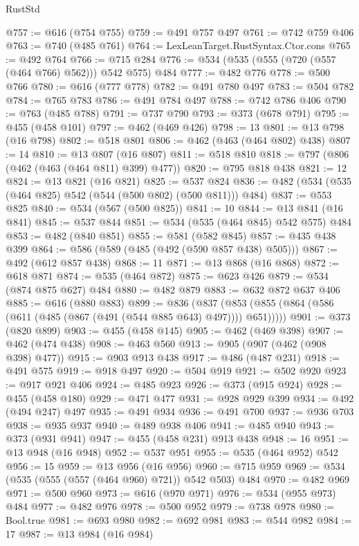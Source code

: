 \begin{lexlean}{RustStd}
\begin{coremodule}
{\begin{coremodule}
{{{{{{{{{{{{{{@757 := @616 (@754 @755)
@759 := @491 @757 @497
@761 := @742 @759 @406
@763 := @740 (@485 @761)
@764 := LexLeanTarget.RustSyntax.Ctor.cons
@765 := @492 @764
@766 := @715 @284
@776 := @534 (@535 (@555 (@720 (@557 (@464 @766) @562))) @542 @575) @484
@777 := @482 @776
@778 := @500 @766
@780 := @616 (@777 @778)
@782 := @491 @780 @497
@783 := @504 @782
@784 := @765 @783
@786 := @491 @784 @497
@788 := @742 @786 @406
@790 := @763 (@485 @788)
@791 := @737 @790
@793 := @373 (@678 @791)
@795 := @455 (@458 @101)
@797 := @462 (@469 @426)
@798 := 13
@801 := @13 @798 (@16 @798)
@802 := @518 @801
@806 := @462 (@463 (@464 @802) @438)
@807 := 14
@810 := @13 @807 (@16 @807)
@811 := @518 @810
@818 := @797 (@806 (@462 (@463 (@464 @811) @399) @477))
@820 := @795 @818 @438
@821 := 12
@824 := @13 @821 (@16 @821)
@825 := @537 @824
@836 := @482 (@534 (@535 (@464 @825) @542 (@544 (@500 @802) (@500 @811))) @484)
@837 := @553 @825
@840 := @534 (@567 (@500 @825))
@841 := 10
@844 := @13 @841 (@16 @841)
@845 := @537 @844
@851 := @534 (@535 (@464 @845) @542 @575) @484
@853 := @482 (@840 @851)
@855 := @581 (@582 @845)
@857 := @435 @438 @399
@864 := @586 (@589 (@485 (@492 (@590 @857 @438) @505)))
@867 := @492 (@612 @857 @438)
@868 := 11
@871 := @13 @868 (@16 @868)
@872 := @618 @871
@874 := @535 (@464 @872)
@875 := @623 @426
@879 := @534 (@874 @875 @627) @484
@880 := @482 @879
@883 := @632 @872 @637 @406
@885 := @616 (@880 @883)
@899 := @836
    (@837 (@853 (@855 (@864 (@586 (@611 (@485 (@867 (@491 (@544 @885 @643) @497)))) @651)))))
@901 := @373 (@820 @899)
@903 := @455 (@458 @145)
@905 := @462 (@469 @398)
@907 := @462 (@474 @438)
@908 := @463 @560
@913 := @905 (@907 (@462 (@908 @398) @477))
@915 := @903 @913 @438
@917 := @486 (@487 @231)
@918 := @491 @575
@919 := @918 @497
@920 := @504 @919
@921 := @502 @920
@923 := @917 @921 @406
@924 := @485 @923
@926 := @373 (@915 @924)
@928 := @455 (@458 @180)
@929 := @471 @477
@931 := @928 @929 @399
@934 := @492 (@494 @247) @497
@935 := @491 @934
@936 := @491 @700
@937 := @936 @703
@938 := @935 @937
@940 := @489 @938 @406
@941 := @485 @940
@943 := @373 (@931 @941)
@947 := @455 (@458 @231) @913 @438
@948 := 16
@951 := @13 @948 (@16 @948)
@952 := @537 @951
@955 := @535 (@464 @952) @542
@956 := 15
@959 := @13 @956 (@16 @956)
@960 := @715 @959
@969 := @534 (@535 (@555 (@557 (@464 @960) @721)) @542 @503) @484
@970 := @482 @969
@971 := @500 @960
@973 := @616 (@970 @971)
@976 := @534 (@955 @973) @484
@977 := @482 @976
@978 := @500 @952
@979 := @738 @978
@980 := Bool.true
@981 := @693 @980
@982 := @692 @981
@983 := @544 @982
@984 := 17
@987 := @13 @984 (@16 @984)
}}}}}}}}}}}}}}
\end{coremodule}}
\end{coremodule}
\end{lexlean}
